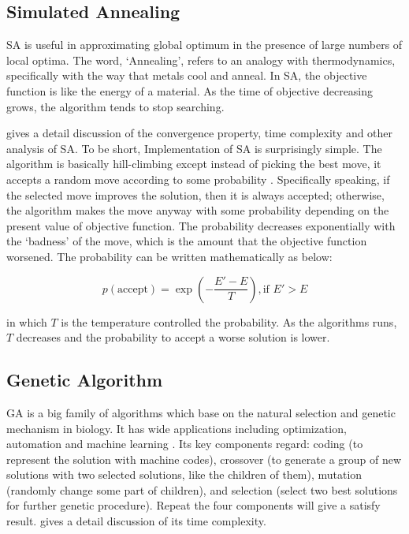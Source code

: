 \documentclass[a4paper,12pt]{article}
\begin{document}
	\subsection{Simulated Annealing}

	SA is useful in approximating global optimum in the presence of large numbers of local optima.  The word, `Annealing', refers to an analogy with thermodynamics, specifically with the way that metals cool and anneal.  In SA, the objective function is like the energy of a material. As the time of objective decreasing grows, the algorithm tends to stop searching.

	\cite{ref4} gives a detail discussion of the convergence property, time complexity and other analysis of SA. To be short, Implementation of SA is surprisingly simple.  The algorithm is basically hill-climbing except instead of picking the best move, it accepts a random move according to some probability \cite{ref4, ref5}. Specifically speaking, if the selected move improves the solution, then it is always accepted; otherwise, the algorithm makes the move anyway with some probability depending on the present value of objective function. The probability decreases exponentially with the `badness' of the move, which is the amount that the objective function worsened. The probability can be written mathematically as below:

	\begin{equation*}
	p(\text{accept}) = \exp (-\frac{E'-E}{T}), \text{if } E' > E
	\end{equation*}

in which $T$ is the temperature controlled the probability. As the algorithms runs, $T$ decreases and the probability to accept a worse solution is lower.

	\subsection{Genetic Algorithm}

	GA is a big family of algorithms which base on the natural selection and genetic mechanism in biology. It has wide applications including optimization, automation and machine learning \cite{ref6,ref8}. Its key components regard: coding (to represent the solution with machine codes), crossover (to generate a group of new solutions with two selected solutions, like the children of them), mutation (randomly change some part of children), and selection (select two best solutions for further genetic procedure). Repeat the four components will give a satisfy result. \cite{ref7} gives a detail discussion of its time complexity.
\end{document}
